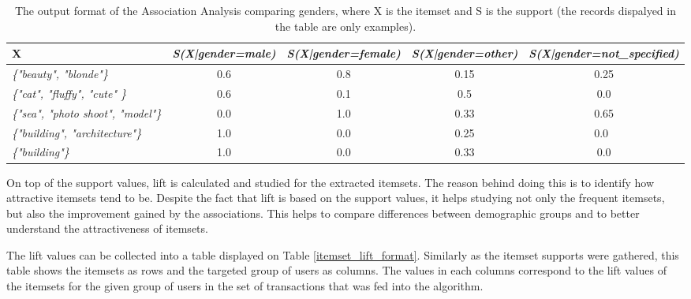     \begin{table}[H]
        \centering
        \begin{adjustbox}{width=1\textwidth}
            \begin{tabular}{l|c|c|c|c}
                X & \emph{S(X|gender=male)} & \emph{S(X|gender=female)} & \emph{S(X|gender=other)} & \emph{S(X|gender=not\_specified)} \\
                \hline
                \emph{\{"beauty", "blonde"\}} & 0.6 & 0.8 & 0.15 & 0.25 \\
                \emph{\{"cat", "fluffy", "cute" \}} & 0.6 & 0.1 & 0.5 & 0.0 \\
                \emph{\{"sea", "photo shoot", "model"\}} & 0.0 & 1.0 & 0.33 & 0.65 \\
                \emph{\{"building", "architecture"\}} & 1.0 & 0.0 & 0.25 & 0.0 \\
                \emph{\{"building"\}} & 1.0 & 0.0 & 0.33 & 0.0
            \end{tabular}
        \end{adjustbox}
        \caption{The output format of the Association Analysis comparing genders, where X is the itemset and S is the support (the records dispalyed in the table are only examples).}
        \label{itemset_supports_format}
    \end{table}

    On top of the support values, lift is calculated and studied for the extracted itemsets. The reason behind doing this is to identify how attractive itemsets tend to be. Despite the fact that lift is based on the support values, it helps studying not only the frequent itemsets, but also the improvement gained by the associations. This helps to compare differences between demographic groups and to better understand the attractiveness of itemsets.

    The lift values can be collected into a table displayed on Table \ref{itemset_lift_format}. Similarly as the itemset supports were gathered, this table shows the itemsets as rows and the targeted group of users as columns. The values in each columns correspond to the lift values of the itemsets for the given group of users in the set of transactions that was fed into the algorithm. 

